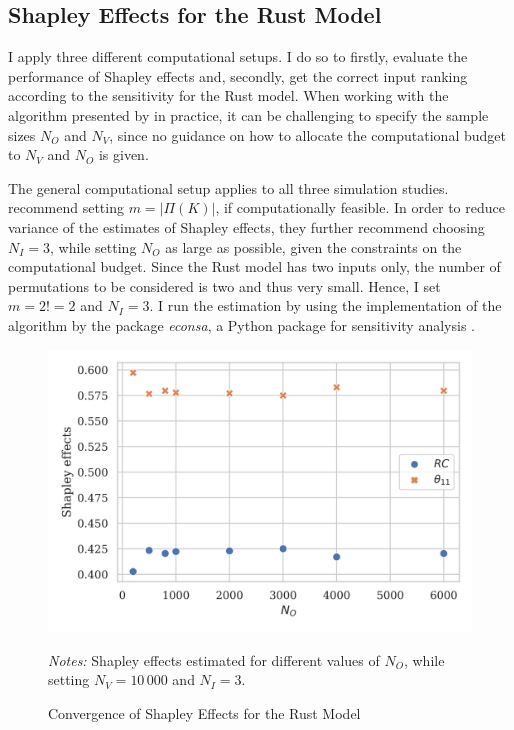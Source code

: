 \subsection{Shapley Effects for the Rust Model} \label{shapley_rust_model}

I apply three different computational setups. I do so to firstly, evaluate the performance of Shapley effects and, secondly, get the correct input ranking according to the sensitivity for the Rust model. When working with the algorithm presented by \citet{SNS16} in practice, it can be challenging to specify the sample sizes $N_O$ and $N_V$, since no guidance on how to allocate the computational budget to $N_V$ and $N_O$ is given.

The general computational setup applies to all three simulation studies. \citet{SNS16} recommend setting $m=\vert \Pi(K) \vert$, if computationally feasible. In order to reduce variance of the estimates of Shapley effects, they further recommend choosing $N_I=3$, while setting $N_O$ as large as possible, given the constraints on the computational budget. Since the Rust model has two inputs only, the number of permutations to be considered is two and thus very small. Hence, I set $m=2!=2$ and $N_I=3$. I run the estimation by using the implementation of the algorithm by the package \textit{econsa}, a Python package for sensitivity analysis \citep{OSE21}.


\begin{figure}[t]
	\caption{Convergence of Shapley Effects for the Rust Model}
    \label{shapley_convergence}
	\begin{centering}
	\vspace*{-4mm}
	\begin{centering}
	\includegraphics[scale=0.9]{../figures/convergence_shapley_effects_8.png}
	\end{centering}
	\end{centering}

	\small
	\textit{Notes:} Shapley effects estimated for different values of $N_O$, while setting $N_V=10\,000$ and $N_I=3$.
\end{figure}

